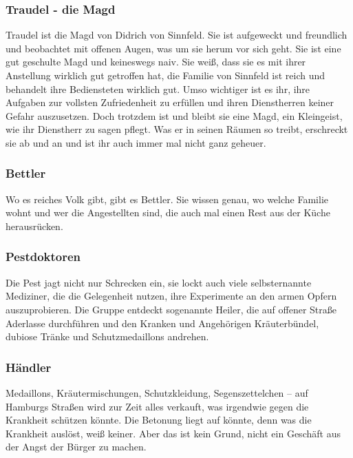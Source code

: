 \subsubsection*{Traudel - die Magd}
\label{Traudel}

Traudel ist die Magd von Didrich von Sinnfeld. Sie ist aufgeweckt und freundlich und beobachtet mit offenen Augen, was um sie herum vor sich geht. Sie ist eine gut geschulte Magd und keineswegs naiv. Sie weiß, dass sie es mit ihrer Anstellung wirklich gut getroffen hat, die Familie von Sinnfeld ist reich und behandelt ihre Bediensteten wirklich gut. Umso wichtiger ist es ihr, ihre Aufgaben zur vollsten Zufriedenheit zu erfüllen und ihren Dienstherren keiner Gefahr auszusetzen. Doch trotzdem ist und bleibt sie eine Magd, ein Kleingeist, wie ihr Dienstherr zu sagen pflegt. Was er in seinen Räumen so treibt, erschreckt sie ab und an und ist ihr auch immer mal nicht ganz geheuer.

\subsubsection*{Bettler}
\label{Bettler}

Wo es reiches Volk gibt, gibt es Bettler. Sie wissen genau, wo welche Familie wohnt und wer die Angestellten sind, die auch mal einen Rest aus der Küche herausrücken.

\subsubsection*{Pestdoktoren}
\label{Pestdoktoren}

Die Pest jagt nicht nur Schrecken ein, sie lockt auch viele selbsternannte Mediziner, die die Gelegenheit nutzen, ihre Experimente an den armen Opfern auszuprobieren. Die Gruppe entdeckt sogenannte Heiler, die auf offener Straße Aderlasse durchführen und den Kranken und Angehörigen Kräuterbündel, dubiose Tränke und Schutzmedaillons andrehen.

\subsubsection*{Händler}
\label{Händler}

Medaillons, Kräutermischungen, Schutzkleidung, Segenszettelchen – auf Hamburgs Straßen wird zur Zeit alles verkauft, was irgendwie gegen die Krankheit schützen könnte. Die Betonung liegt auf könnte, denn was die Krankheit auslöst, weiß keiner. Aber das ist kein Grund, nicht ein Geschäft aus der Angst der Bürger zu machen.

